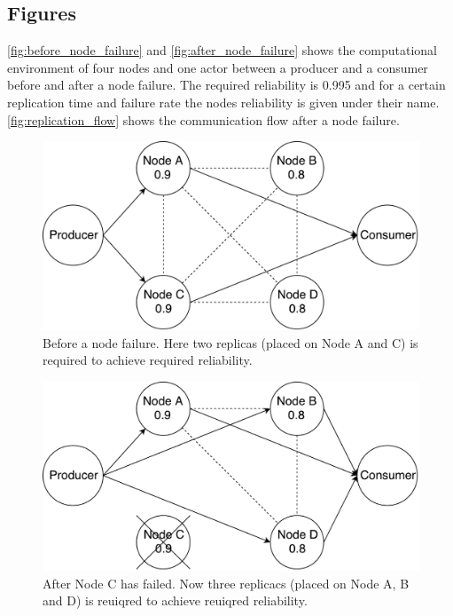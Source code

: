 \documentclass{cslthse-msc}
\begin{document}
\begin{appendices}
\chapter{Figures} \label{appendix:figures}
\autoref{fig:before_node_failure} and \autoref{fig:after_node_failure} shows the computational environment of four nodes and one actor between a producer and a consumer before and after a node failure. The required reliability is 0.995 and for a certain replication time and failure rate the nodes reliability is given under their name. \autoref{fig:replication_flow} shows the communication flow after a node failure.

\begin{figure}[!hbt]
\centering
\includegraphics[scale=0.5]{images/before_node_failure.pdf}
\caption{Before a node failure. Here two replicas (placed on Node A and C) is required to achieve required reliability.} \label{fig:before_node_failure}
\end{figure}

\begin{figure}[!hbt]
\centering
\includegraphics[scale=0.5]{images/after_node_failure.pdf}
\caption{After Node C has failed. Now three replicacs (placed on Node A, B and D) is reuiqred to achieve reuiqred reliability.} \label{fig:after_node_failure}
\end{figure}


\end{appendices}
\end{document}
